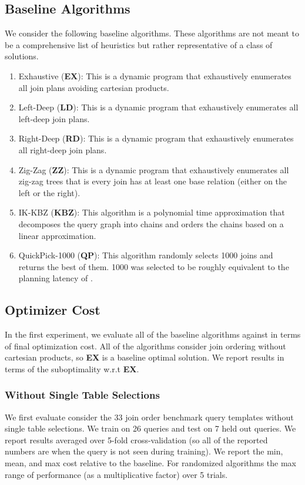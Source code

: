 \subsection{Baseline Algorithms}
We consider the following baseline algorithms. These algorithms are not meant to be a comprehensive list of heuristics but rather representative of a class of solutions.

\begin{enumerate}
    \item Exhaustive (\textbf{EX}): This is a dynamic program that exhaustively enumerates all join plans avoiding cartesian products.
    \item Left-Deep (\textbf{LD}): This is a dynamic program that exhaustively enumerates all left-deep join plans.
    \item Right-Deep (\textbf{RD}): This is a dynamic program that exhaustively enumerates all right-deep join plans.
    \item Zig-Zag (\textbf{ZZ}): This is a dynamic program that exhaustively enumerates all zig-zag trees that is every join has at least one base relation (either on the left or the right).
    \item IK-KBZ (\textbf{KBZ}): This algorithm is a polynomial time approximation that decomposes the query graph into chains and orders the chains based on a linear approximation.
    \item QuickPick-1000 (\textbf{QP}): This algorithm randomly selects 1000 joins and returns the best of them. 1000 was selected to be roughly equivalent to the planning latency of \sys.
\end{enumerate}

\subsection{Optimizer Cost}
In the first experiment, we evaluate all of the baseline algorithms against \sys in terms of final optimization cost. All of the algorithms consider join ordering without cartesian products, so \textbf{EX} is a baseline optimal solution. We report results in terms of the suboptimality w.r.t \textbf{EX}.

\subsubsection{Without Single Table Selections}
We first evaluate consider the 33 join order benchmark query templates without single table selections. We train on 26 queries and test on 7 held out queries. We report results averaged over 5-fold cross-validation (so all of the reported numbers are when the query is not seen during training). We report the min, mean, and max cost relative to the baseline.  For randomized algorithms the max range of performance (as a multiplicative factor) over 5 trials.

